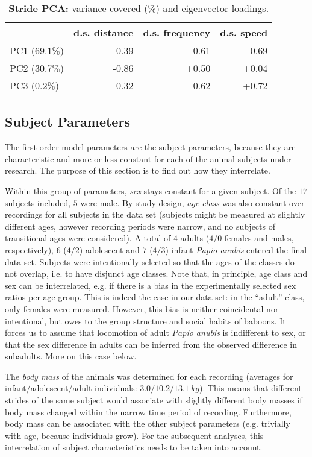 \begin{table}[p]
\caption{\label{tab:stridepca}\textbf{Stride PCA:} variance covered (\%) and eigenvector loadings.}
\centering
\begin{tabular}{l|rrr}
 & d.s. distance & d.s. frequency & d.s. speed\\[0pt]
\hline
PC1 (\(69.1 \%\)) & -0.39 & -0.61 & -0.69\\[0pt]
PC2 (\(30.7 \%\)) & -0.86 & +0.50 & +0.04\\[0pt]
PC3 (\(0.2 \%\)) & -0.32 & -0.62 & +0.72\\[0pt]
\end{tabular}
\end{table}

\clearpage
\subsection{Subject Parameters}
\label{sec:orgb7153d3}
The first order model parameters are the subject parameters, because they are characteristic and more or less constant for each of the animal subjects under research.
The purpose of this section is to find out how they interrelate.

Within this group of parameters, \emph{sex} stays constant for a given subject.
Of the \(17\) subjects included, \(5\) were male.
By study design, \emph{age class} was also constant over recordings for all subjects in the data set (subjects might be measured at slightly different ages, however recording periods were narrow, and no subjects of transitional ages were considered).
A total of
\(4\) adults (\(4/0\) females and males, respectively),
\(6\) (\(4/2\)) adolescent
and \(7\) (\(4/3\)) infant
\emph{Papio anubis} entered the final data set.
Subjects were intentionally selected so that the ages of the classes do not overlap, i.e. to have disjunct age classes.
Note that, in principle, age class and sex can be interrelated, e.g. if there is a bias in the experimentally selected sex ratios per age group.
This is indeed the case in our data set: in the ``adult'' class, only females were measured.
However, this bias is neither coincidental nor intentional, but owes to the group structure and social habits of baboons.
It forces us to assume that locomotion of adult \emph{Papio anubis} is indifferent to sex, or that the sex difference in adults can be inferred from the observed difference in subadults.
More on this case below.


The \emph{body mass} of the animals was determined for each recording (averages for infant/adolescent/adult individuals: \(3.0/10.2/13.1\ kg\)).
This means that different strides of the same subject would associate with slightly different body masses if body mass changed within the narrow time period of recording.
Furthermore, body mass can be associated with the other subject parameters (e.g. trivially with age, because individuals grow).
For the subsequent analyses, this interrelation of subject characteristics needs to be taken into account.

